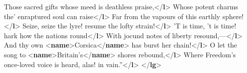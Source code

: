 \begin{shaded}
\hspace*{1em}Those sacred gifts whose meed is deathless praise,{</\textbf{l}>}\mbox{}\newline 
\hspace*{1em}Whose potent charms the' enraptured soul can raise{</\textbf{l}>}\mbox{}\newline 
\hspace*{1em}Far from the vapours of this earthly sphere!{</\textbf{l}>}\mbox{}\newline 
{}\mbox{}\newline 
{}\mbox{}\newline 
\hspace*{1em}Seize, seize the lyre! resume the lofty strain!{</\textbf{l}>}\mbox{}\newline 
\hspace*{1em}'T is time, 't is time! hark how the nations round{</\textbf{l}>}\mbox{}\newline 
\hspace*{1em}With jocund notes of liberty resound,—{</\textbf{l}>}\mbox{}\newline 
\hspace*{1em}And thy own {<\textbf{name}>}Corsica{</\textbf{name}>} has burst her chain!{</\textbf{l}>}\mbox{}\newline 
\hspace*{1em}O let the song to {<\textbf{name}>}Britain's{</\textbf{name}>} shores rebound,{</\textbf{l}>}\mbox{}\newline 
\hspace*{1em}Where Freedom's once-loved voice is heard,\mbox{}\newline 
\hspace*{1em}\hspace*{1em}\hspace*{1em}\hspace*{1em} alas! in vain.”{</\textbf{l}>}\mbox{}\newline 
{}\mbox{}\newline 
{</\textbf{lg}>}\end{shaded}\egroup\par \par
